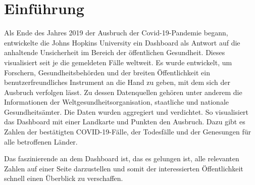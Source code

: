 \chapter{Einführung}
Als Ende des Jahres 2019 der Ausbruch der Covid-19-Pandemie begann, entwickelte die 
Johns Hopkins University ein Dashboard als Antwort auf die anhaltende Unsicherheit im Bereich der öffentlichen Gesundheit. 
Dieses visualisiert seit je die gemeldeten Fälle weltweit. Es wurde entwickelt, um Forschern, Gesundheitsbehörden und der breiten Öffentlichkeit 
ein benutzerfreundliches Instrument an die Hand zu geben, mit dem sich der Ausbruch verfolgen lässt. 
Zu dessen Datenquellen gehören unter anderem die Informationen der Weltgesundheitsorganisation, staatliche und nationale
Gesundheitsämter. Die Daten wurden aggregiert und verdichtet. So visualisiert das Dashboard mit einer Landkarte und Punkten den Ausbruch. 
Dazu gibt es Zahlen der bestätigten COVID-19-Fälle, der Todesfälle und  der Genesungen für alle betroffenen Länder\cite[Vgl.][533]{dong_interactive_2020}.

Das faszinierende an dem Dashboard ist, das es gelungen ist, alle relevanten Zahlen auf einer Seite darzustellen
und somit der interessierten Öffentlichkeit schnell einen Überblick zu verschaffen.

